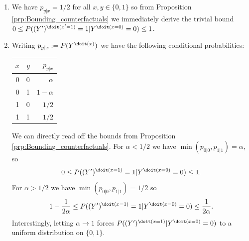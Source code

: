 \begin{enumerate}[label=12.\arabic*]
\begin{gradedsolution}
\begin{enumerate}
			\item {} We have $p_{y|x}=1/2$ for all $x, y\in\{0,1\}$ so from Proposition \ref*{prp:Bounding_counterfactuals} we immediately derive the trivial bound $0 \leq P((Y')^{\doit(x'=1)}=1|Y^{\doit(x=0)}=0) \leq 1$.
			\item {} Writing $p_{y|x} := P(Y^{\doit(x)})$ we have the following conditional probabilities:
			\begin{center}\begin{tabular}{rrr}
					$x$ & $y$ & $p_{y|x}$  \\
					\hline
					0   & 0   & $\alpha$   \\ %
					0   & 1   & $1-\alpha$ \\ %
					1   & 0   & $1/2$      \\ %
					1   & 1   & $1/2$      \\ %
				\end{tabular}\end{center}
			We can directly read off the bounds from Proposition \ref*{prp:Bounding_counterfactuals}. For $\alpha < 1/2$ we have $\min(p_{0|0}, p_{1|1}) = \alpha$, so
			$$0 \le P((Y')^{\doit(x=1)} = 1 | Y^{\doit(x=0)}=0) \le 1.$$
			For $\alpha > 1/2$ we have $\min(p_{0|0}, p_{1|1}) = 1/2$ so
			$$1 - \frac{1}{2\alpha} \le P((Y')^{\doit(x=1)} = 1 | Y^{\doit(x=0)}=0) \le \frac{1}{2\alpha}.$$
			Interestingly, letting $\alpha \to 1$ forces $P((Y')^{\doit(x=1)} | Y^{\doit(x=0)}=0)$ to a uniform distribution on $\{0,1\}$.
		\end{enumerate}
	\end{gradedsolution}


\end{enumerate}
